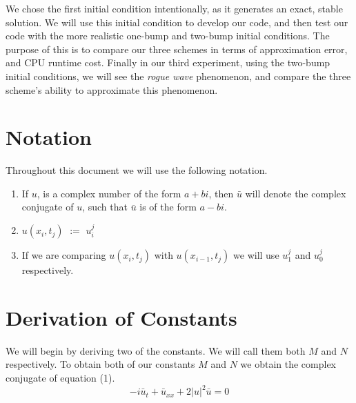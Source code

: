 \documentclass[11pt, oneside]{article}   	%
\begin{document}
We chose the first initial condition intentionally, as it generates an exact, stable solution. We will use this initial condition to develop our code, and then test our code with the more realistic one-bump and two-bump initial conditions. The purpose of this is to compare our three schemes in terms of approximation error, and CPU runtime cost. Finally in our third experiment, using the two-bump initial conditions, we will see the \textit{rogue wave} phenomenon, and compare the three scheme's ability to approximate this phenomenon.

\section{Notation}

Throughout this document we will use the following notation.
\begin{enumerate}
    \item If $u$, is a complex number of the form $a + bi$, then $\bar{u}$ will denote the complex conjugate of $u$, such that $\bar{u}$ is of the form $a - bi$.
    \item $u(x_i,t_j)$ $:=$ $u_i^j$
    \item If we are comparing $u(x_i,t_j)$ with $u(x_{i-1},t_j)$ we will use $u_1^j$ and $u_0^j$ respectively.
\end{enumerate}

\section{Derivation of Constants}

We will begin by deriving two of the constants. We will call them both $M$ and $N$ respectively. To obtain both of our constants $M$ and $N$ we obtain the complex conjugate of equation (1).\\
\begin{equation} \label{eq:4}
-i\bar{u}_t + \bar{u}_{xx} + 2|u|^2\bar{u} = 0
\end{equation}
\end{document}
